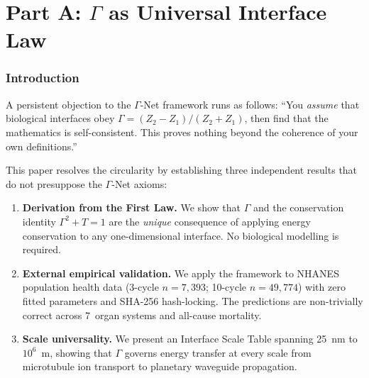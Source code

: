 \documentclass[aps,pre,twocolumn,superscriptaddress,floatfix]{revtex4-2}
\begin{document}
\maketitle


\part*{Part A: $\Gamma$ as Universal Interface Law}


\section{Introduction}
\label{sec:intro}

A persistent objection to the $\Gamma$-Net framework
runs as follows: ``You \emph{assume} that biological
interfaces obey $\Gamma = (Z_2-Z_1)/(Z_2+Z_1)$, then
find that the mathematics is self-consistent.  This
proves nothing beyond the coherence of your own
definitions.''

This paper resolves the circularity by establishing
three independent results that do not presuppose
the $\Gamma$-Net axioms:

\begin{enumerate}
  \item \textbf{Derivation from the First Law.}
    We show that $\Gamma$ and the conservation identity
    $\Gamma^2 + T = 1$ are the \emph{unique} consequence
    of applying energy conservation to any one-dimensional
    interface.  No biological modelling is required.

  \item \textbf{External empirical validation.}
    We apply the framework to NHANES population health data
    (3-cycle $n = 7{,}393$; 10-cycle $n = 49{,}774$)
    with zero fitted parameters and SHA-256 hash-locking.
    The predictions are non-trivially correct across
    7~organ systems and all-cause mortality.

  \item \textbf{Scale universality.}
    We present an Interface Scale Table spanning 25~nm
    to $10^6$~m, showing that $\Gamma$ governs energy
    transfer at every scale from microtubule ion transport
    to planetary waveguide propagation.
\end{enumerate}
\end{document}
